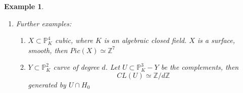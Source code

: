 \documentclass[11pt]{article}
\newtheorem{ex}[thm]{Example}
\newcommand{\proj}{\mathbb P}
\newcommand{\intg}{\mathbb Z}
\newcommand{\Lrta}{\Longrightarrow}
\newcommand{\lrta}{\longrightarrow}
\begin{document}
\begin{ex}
\begin{enumerate}[label=(\arabic*)]
\begin{proof}
\begin{enumerate}[label=(\alph*)]
$\Lrta$
$$
\begin{aligned}
\underline{deg}(div(f))&=\sum n_i \underline{deg}(D_i-\sum m_j \underline{deg}(E_j)\\ 
&(\underline{deg}(D_i)=deg(h_i),\underline{deg}(E_j)=deg(k_j))\\
&=deg(g_1)-deg(g_2)=0.
\end{aligned}
$$
Then we come back to prove the \underline{Key fact}:
$$
f_1=\sum_{\underline{d}}\alpha_{\underline{d}} \left(\frac{X_0}{X_0}\right)^{d_0}\cdots \left(\frac{X_n}{X_0}\right)^{d_n}
$$
e.g.
$$
\begin{aligned}
&\left(\frac{X_1}{X_0}\right)^{2}+37 \left(\frac{X_1}{X_0}\right)^{3}\left(\frac{X_2}{X_0}\right)\\
&=\frac{X_0^2X_1^2+37X_1^3X_2}{X_0^4}\\
&=\frac{1}{X_0^{deg f_1}}\sum_{\underline{d}}\alpha_{\underline{d}} X_0^{deg f_1-\sum_{i=1}^n d_i} X_1^{}d_1\cdots X_n^{d_n}\\
&=\frac{\text{homogeneous degree $deg f_1$}}{X_0^{deg f_1}}\\
\end{aligned}
$$
$$
\Lrta f_2=\frac{\text{homogeneous degree $deg f_2$}}{X_0^{deg f_2}}\\
$$
$$
\Lrta \frac{f_1}{f_2}=\frac{X_0^{ deg f_1}(deg f_1)}{(deg f_2) X_0^{deg f_1}}
$$

\item $\underline{deg}: Cl(X)\lrta \intg$ is surjective because $\underline{deg}(D_0)=1$, $D_0$ associated to $X_0$ and injective because if $deg(D)=0$ write $D=D_1-D_2$ with $D_1,D_2$ effective then $\underline{deg}(D_1)=\underline{deg}(D_2)$. Write 
$D_1=\sum n_i E_i$, where $E_i$ is prime divisors associated to $h_i$. 
$D_2=\sum m_j F_j$, where $F_j$ is prime divisors associated to $k_j$. 


Then let $f=\prod h_i ^{n_i}\prod k_j^{- m_j}\in K(X)^\times$, and as shown above $dic(f)=D_1-D_2=D$ so $D$ is  $0$ in $Cl(X)$.
\item the proof can be found in Hartshorne
\end{enumerate}
\end{proof}
\item Further examples: 
\begin{enumerate}[label=(\alph*)]
\item $X\subset \proj^4_K$ cubic, where $K$ is an algebraic closed field. $X$ is a  surface, smooth, then $Pic(X)\simeq \intg^7$
\item $Y\subset \proj^2_K$ curve of degree $d$. Let $U\subset \proj^3_K-Y$ be the complements, then 
$$
CL(U)\simeq \intg/d\intg
$$
generated by $U\cap H_0$
\end{enumerate}
\end{enumerate}
\end{ex}
\end{document}

